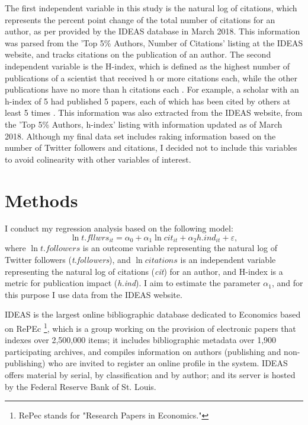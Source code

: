 \documentclass[12pt,english]{article}
\begin{document}
The first independent variable in this study is the natural log of citations, which represents the percent point change of the total number of citations for an author, as per provided by the IDEAS database in March 2018. This information was parsed from the 'Top 5\% Authors, Number of Citations' listing at the IDEAS website, and tracks citations on the publication of an author. The second independent variable is the H-index, which is defined as the highest number of publications of a scientist that received h or more citations each, while the other publications have no more than h citations each \citep{h.index}. For example, a scholar with an h-index of 5 had published 5 papers, each of which has been cited by others at least 5 times \citep{umich}. This information was also extracted from the IDEAS website, from the 'Top 5\% Authors, h-index' listing with information updated as of March 2018. Although my final data set includes raking information based on the number of Twitter followers and citations, I decided not to include this variables to avoid colinearity with other variables of interest. 

\section{Methods}\label{sec:methods}

I conduct my regression analysis based on the following model:
\begin{equation}
\label{eq:1}
\ln {t.fllwrs}_{it}=\alpha_{0} + \alpha_{1}\ln {cit}_{it} + \alpha_{2} h.ind_{it} + \varepsilon,
\end{equation}
where $\ln{t.followers}$ is an outcome variable representing the natural log of Twitter followers (\textit{t.followers}), and $\ln{citations}$ is an independent variable representing the natural log of citations (\textit{cit}) for an author, and H-index is a metric for publication impact (\textit{h.ind}). I aim to estimate the parameter $\alpha_{1}$, and for this purpose I use data from the IDEAS website.

IDEAS is the largest online bibliographic database dedicated to Economics based on RePEc \footnote{RePec stands for "Research Papers in Economics."}, which is a group working on the provision of electronic papers that indexes over 2,500,000 items; it includes bibliographic metadata over 1,900 participating archives, and compiles information on authors (publishing and non-publishing) who are invited to register an online profile in the system\citep{ideas}. IDEAS offers material by serial, by classification and by author; and its server is hosted by the Federal Reserve Bank of St. Louis. 
\end{document}
